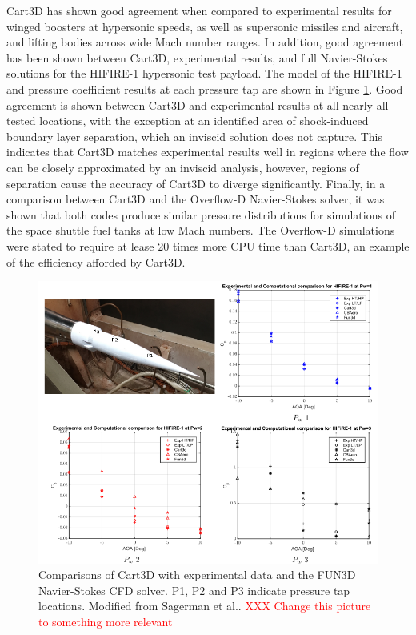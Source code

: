 Cart3D has shown good agreement when compared to experimental results for winged boosters at hypersonic speeds\cite{Sagerman2017}, as well as supersonic missiles\cite{Abeynayake} and aircraft\cite{Aftosmis2011}, and lifting bodies across wide Mach number ranges\cite{Almosnino2016a}.
In addition, good agreement has been shown between Cart3D, experimental results, and full Navier-Stokes solutions for the HIFIRE-1 hypersonic test payload\cite{Sagerman2017}. The model of the HIFIRE-1 and pressure coefficient results at each pressure tap are shown in Figure \ref{fig:Cart3DComparisons}. 
Good agreement is shown between Cart3D and experimental results at all nearly all tested locations, with the exception at an identified area of shock-induced boundary layer separation, which an inviscid solution does not capture\cite{Sagerman2017}. 
This indicates that Cart3D matches experimental results well in regions where the flow can be closely approximated by an inviscid analysis, however, regions of separation cause the accuracy of Cart3D to diverge significantly. 
Finally, in a comparison between Cart3D and the Overflow-D Navier-Stokes solver, it was shown that both codes produce similar pressure distributions for simulations of the space shuttle fuel tanks at low Mach numbers\cite{Gomez2004}. The Overflow-D simulations were stated to require at lease 20 times more CPU time than Cart3D\cite{Gomez2004}, an example of the efficiency afforded by Cart3D.
\begin{figure}[ht]
\centering
\includegraphics[width=0.9\linewidth]{"figures/2_literature-review/Cart3D Comparisons"}
\caption{Comparisons of Cart3D with experimental data and the FUN3D Navier-Stokes CFD solver. P1, P2 and P3 indicate pressure tap locations. Modified from Sagerman et al.\cite{Sagerman2017}. \textcolor{red}{XXX Change this picture to something more relevant}}
\label{fig:Cart3DComparisons}
\end{figure}




